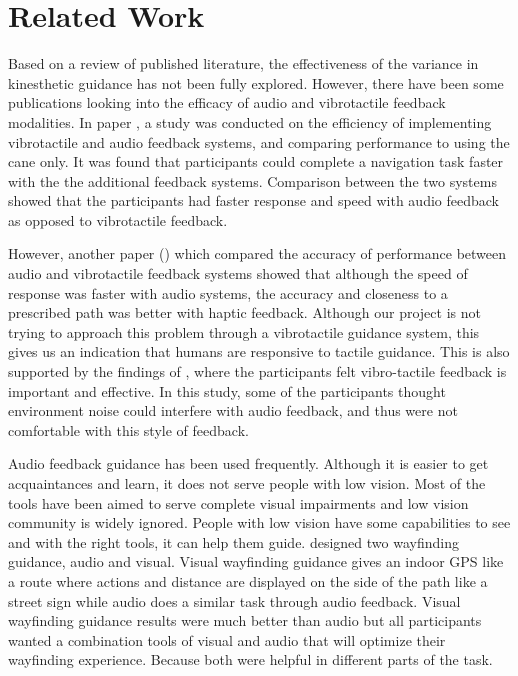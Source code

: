 \section{Related Work}
Based on a review of published literature, the effectiveness of the variance in kinesthetic guidance has not been fully explored. 
However, there have been some publications looking into the efficacy of audio and vibrotactile feedback modalities. 
In paper \cite{PLosONE}, a study was conducted on the efficiency of implementing vibrotactile and audio feedback systems, and comparing performance to using the cane only. 
It was found that participants could complete a navigation task faster with the the additional feedback systems. 
Comparison between the two systems showed that the participants had faster response and speed with audio feedback as opposed to vibrotactile feedback. 

However, another paper (\cite{IEEE}) which compared the accuracy of performance between audio and vibrotactile feedback systems showed that although the speed of response was faster with audio systems, the accuracy and closeness to a prescribed path was better with haptic feedback. 
Although our project is not trying to approach this problem through a vibrotactile guidance system, this gives us an indication that humans are responsive to tactile guidance. 
This is also supported by the findings of \cite{autonavigation}, where the participants felt vibro-tactile feedback is important and effective. 
In this study, some of the participants thought environment noise could interfere with audio feedback, and thus were not comfortable with this style of feedback. 

Audio feedback guidance has been used frequently. 
Although it is easier to get acquaintances and learn, it does not serve people with low vision. 
Most of the tools have been aimed to serve complete visual impairments and low vision community is widely ignored. People with low vision have some capabilities to see and with the right tools, it can help them guide. 
\cite{smartglasses} designed two wayfinding guidance, audio and visual. 
Visual wayfinding guidance gives an indoor GPS like a route where actions and distance are displayed on the side of the path like a street sign while audio does a similar task through audio feedback. 
Visual wayfinding guidance results were much better than audio but all participants wanted a combination tools of visual and audio that will optimize their wayfinding experience. 
Because both were helpful in different parts of the task.  

